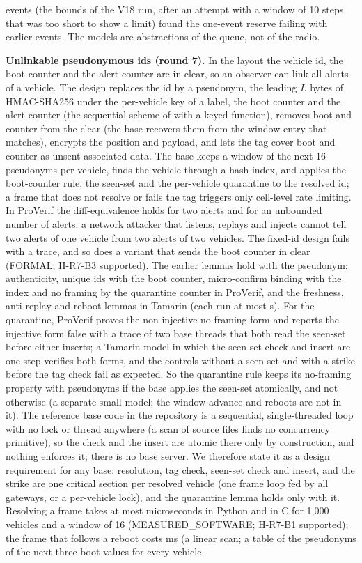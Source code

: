 \documentclass{ieeeaccess}
\begin{document}
events (the bounds of the V18 run, after an attempt with a window of 10 steps that was too short to show a limit) found the one-event reserve failing with \RsevFormMinEarlier{} earlier events. The models are abstractions of the queue, not of the radio.

\textbf{Unlinkable pseudonymous ids (round 7).} In the layout the vehicle id, the boot counter and the alert counter are in clear, so an observer can link all alerts of a vehicle. The design replaces the id by a pseudonym, the leading $L$ bytes of HMAC-SHA256 under the per-vehicle key of a label, the boot counter and the alert counter (the sequential scheme of \cite{R7Pelissier2024} with a keyed function), removes boot and counter from the clear (the base recovers them from the window entry that matches), encrypts the position and payload, and lets the tag cover boot and counter as unsent associated data. The base keeps a window of the next 16 pseudonyms per vehicle, finds the vehicle through a hash index, and applies the boot-counter rule, the seen-set and the per-vehicle quarantine to the resolved id; a frame that does not resolve or fails the tag triggers only cell-level rate limiting. In ProVerif the diff-equivalence holds for two alerts and for an unbounded number of alerts: a network attacker that listens, replays and injects cannot tell two alerts of one vehicle from two alerts of two vehicles. The fixed-id design fails with a trace, and so does a variant that sends the boot counter in clear (FORMAL; H-R7-B3 supported). The earlier lemmas hold with the pseudonym: authenticity, unique ids with the boot counter, micro-confirm binding with the index and no framing by the quarantine counter in ProVerif, and the freshness, anti-replay and reboot lemmas in Tamarin (each run at most \RsevTamExecS{} s). For the quarantine, ProVerif proves the non-injective no-framing form and reports the injective form false with a trace of two base threads that both read the seen-set before either inserts; a Tamarin model in which the seen-set check and insert are one step verifies both forms, and the controls without a seen-set and with a strike before the tag check fail as expected. So the quarantine rule keeps its no-framing property with pseudonyms if the base applies the seen-set atomically, and not otherwise (a separate small model; the window advance and reboots are not in it). The reference base code in the repository is a sequential, single-threaded loop with no lock or thread anywhere (a scan of \RsevcAtomicFiles{} source files finds no concurrency primitive), so the check and the insert are atomic there only by construction, and nothing enforces it; there is no base server. We therefore state it as a design requirement for any base: resolution, tag check, seen-set check and insert, and the strike are one critical section per resolved vehicle (one frame loop fed by all gateways, or a per-vehicle lock), and the quarantine lemma holds only with it. Resolving a frame takes at most \RsevBoneWorstUs{} microseconds in Python and \RsevBoneCUs{} in C for 1,000 vehicles and a window of 16 (MEASURED\_SOFTWARE; H-R7-B1 supported); the frame that follows a reboot costs \RsevBoneResyncMs{} ms (a linear scan; a table of the pseudonyms of the next three boot values for every vehicle 
\end{document}
